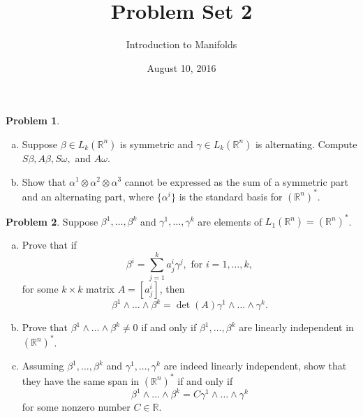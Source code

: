 \documentclass{amsart}
\newcommand{\+}[1]{\ensuremath{\mathbf{#1}}}
\newcommand{\R}{{\mathbb R}}
\theoremstyle{definition}
\newtheorem{prob}{Problem}
\begin{document}
\title{Problem Set 2}
\date{August 10, 2016}
\author{Introduction to Manifolds}

\maketitle



\begin{prob}
 \begin{enumerate}[(a)]
  \item Suppose $\beta \in L_k(\R^n)$ is symmetric and $\gamma \in L_k(\R^n)$ is alternating.
  Compute $S\beta, A\beta, S\omega,$ and $A\omega$.
  \item Show that $\alpha^1 \otimes \alpha^2 \otimes \alpha^3$ cannot be expressed 
  as the sum of a symmetric part and an alternating part, where $\{\alpha^i\}$ is the standard basis for $(\R^n)^*$.
 \end{enumerate}
\end{prob}




\begin{prob}
Suppose $\beta^1, \ldots, \beta^k$ and $\gamma^1, \ldots, \gamma^k$
are elements  of $L_1(\R^n) = (\R^n)^*$.
\begin{enumerate}[(a)]
 \item Prove that if
\begin{equation*}
 \beta^i = \sum^k_{j=1} a^i_j \gamma^j, \text{ for } i = 1,\ldots,k,
\end{equation*}
for some $k \times k$ matrix $A = [a^i_j]$, then
\begin{equation*}
 \beta^1 \wedge \ldots \wedge \beta^k = \det(A) \gamma^1 \wedge
 \ldots \wedge \gamma^k.
\end{equation*}
\item Prove that $\beta^1 \wedge \ldots \wedge \beta^k \neq 0$
if and only if $\beta^1, \ldots, \beta^k$ are linearly independent
in $(\R^n)^*$.
\item Assuming $\beta^1, \ldots, \beta^k$
and $\gamma^1, \ldots, \gamma^k$ are indeed linearly independent,
show that they have the same span in $(\R^n)^*$ if and only if 
\begin{equation*}
  \beta^1 \wedge \ldots \wedge \beta^k = C \gamma^1 \wedge
 \ldots \wedge \gamma^k
\end{equation*}
for some nonzero number $C \in \R$.
\end{enumerate}
\end{prob}
\end{document}
